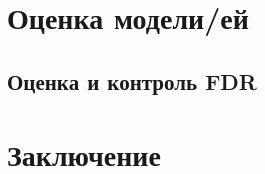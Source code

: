 \documentclass{matmex-diploma}
\begin{document}
\section{Оценка модели/ей}

\subsection{Оценка и контроль FDR}

\section*{Заключение}



\end{document}
